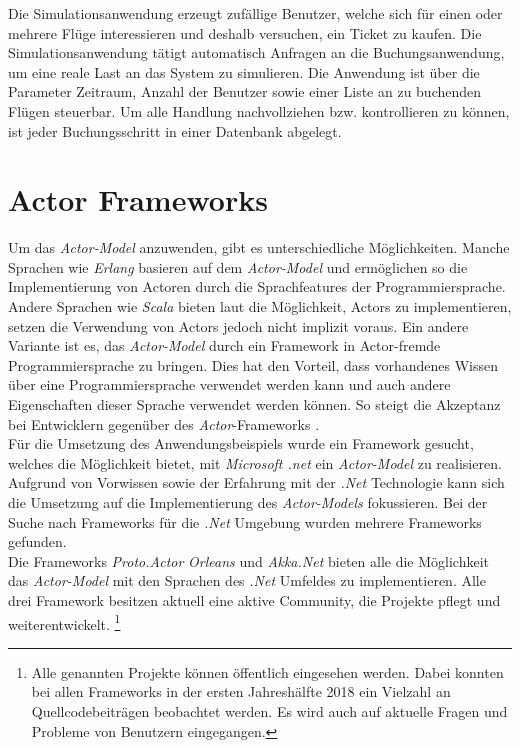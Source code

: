 Die Simulationsanwendung erzeugt zufällige Benutzer, welche sich für einen oder mehrere Flüge interessieren und deshalb versuchen, ein Ticket zu kaufen. Die Simulationsanwendung tätigt automatisch Anfragen an die Buchungsanwendung, um eine reale Last an das System zu simulieren. Die Anwendung ist über die Parameter Zeitraum, Anzahl der Benutzer sowie einer Liste an zu buchenden Flügen steuerbar. 
Um alle Handlung nachvollziehen bzw. kontrollieren zu können, ist jeder Buchungsschritt in einer Datenbank abgelegt.


\section{Actor Frameworks}\label{sec:ActorFrameworks}
Um das \textit{Actor-Model} anzuwenden, gibt es unterschiedliche Möglichkeiten. Manche Sprachen wie \textit{Erlang} basieren auf dem \textit{Actor-Model} und ermöglichen so die Implementierung von Actoren \citep{actorComparativeAnalysis} durch die Sprachfeatures der Programmiersprache. Andere Sprachen wie \textit{Scala} bieten laut \cite{haller2012actors} die Möglichkeit, Actors zu implementieren, setzen die Verwendung von Actors jedoch nicht implizit voraus. Ein andere Variante ist es, das \textit{Actor-Model} durch ein Framework in Actor-fremde Programmiersprache zu bringen. Dies hat den Vorteil, dass vorhandenes Wissen über eine Programmiersprache verwendet werden kann und auch andere Eigenschaften dieser Sprache verwendet werden können. So steigt die Akzeptanz bei Entwicklern gegenüber des \textit{Actor}-Frameworks \citep{lee2006problem}. \\
Für die Umsetzung des Anwendungsbeispiels wurde ein Framework gesucht, welches die Möglichkeit bietet, mit \textit{Microsoft .net} ein \textit{Actor-Model} zu realisieren. Aufgrund von Vorwissen sowie der Erfahrung mit der \textit{.Net} Technologie kann sich die Umsetzung auf die Implementierung des \textit{Actor-Models} fokussieren. Bei der Suche nach Frameworks für die \textit{.Net} Umgebung wurden mehrere Frameworks gefunden. \\
Die Frameworks \textit{Proto.Actor} \textit{Orleans} und \textit{Akka.Net} bieten alle die Möglichkeit das \textit{Actor-Model} mit den Sprachen des \textit{.Net} Umfeldes zu implementieren. Alle drei Framework besitzen aktuell eine aktive Community, die Projekte pflegt und weiterentwickelt.
\footnote{Alle genannten Projekte können öffentlich eingesehen werden. Dabei konnten bei allen Frameworks in der ersten Jahreshälfte 2018 ein Vielzahl an Quellcodebeiträgen beobachtet werden. Es wird auch auf aktuelle Fragen und Probleme von Benutzern eingegangen.}

